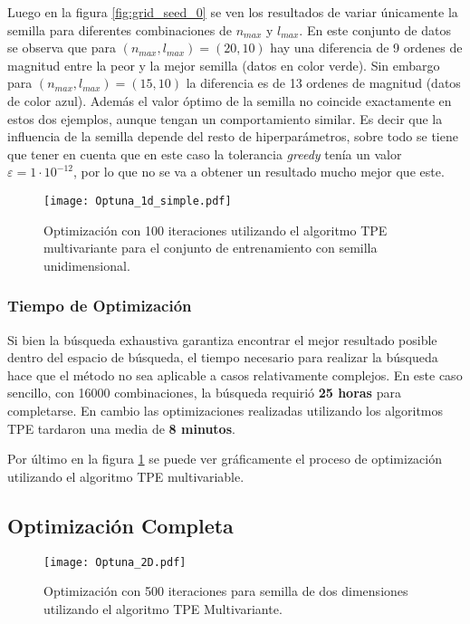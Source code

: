 Luego en la figura \ref{fig:grid_seed_0} se ven los resultados de variar únicamente la semilla para diferentes combinaciones de $n_{max}$ y $l_{max}$. 
En este conjunto de datos se observa que para $(n_{max}, l_{max})=(20, 10)$ hay una diferencia de 9 ordenes de magnitud entre la peor y la mejor semilla (datos en color verde). Sin embargo para $(n_{max}, l_{max})=(15, 10)$ la diferencia es de 13 ordenes de magnitud (datos de color azul). Además el valor óptimo de la semilla no coincide exactamente en estos dos ejemplos, aunque tengan un comportamiento similar. Es decir que la influencia de la semilla depende del resto de hiperparámetros, sobre todo se tiene que tener en cuenta que en este caso la tolerancia \textit{greedy} tenía un valor $\varepsilon = 1\cdot 10^{-12}$, por lo que no se va a obtener un resultado mucho mejor que este.

\begin{figure}[h!]
\centering
\texttt{[image: Optuna\_1d\_simple.pdf]}
\caption{Optimización con 100 iteraciones utilizando el algoritmo TPE multivariante para el conjunto de entrenamiento con semilla unidimensional.}
\label{fig:optuna_1d}
\end{figure}

\subsubsection*{Tiempo de Optimización}

Si bien la búsqueda exhaustiva garantiza encontrar el mejor resultado posible dentro del espacio de búsqueda, el tiempo necesario para realizar la búsqueda hace que el método no sea aplicable a casos relativamente complejos. En este caso sencillo, con 16000 combinaciones, la búsqueda requirió \textbf{25 horas} para completarse. En cambio las optimizaciones realizadas utilizando los algoritmos TPE tardaron una media de \textbf{8 minutos}.

Por último en la figura \ref{fig:optuna_1d} se puede ver gráficamente el proceso de optimización utilizando el algoritmo TPE multivariable.

\subsection{Optimización Completa}

\begin{figure}[p!]
\centering
\texttt{[image: Optuna\_2D.pdf]}
\caption{Optimización con 500 iteraciones para semilla de dos dimensiones utilizando el algoritmo TPE Multivariante.}
\label{fig:optuna_2d}
\end{figure}

